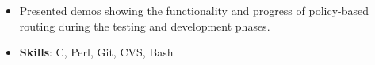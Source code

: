 \documentclass[]{friggeri-cv} %
\begin{document}
\begin{entrylistSkinny}
{\begin{itemize}
  \item Presented demos showing the functionality and progress of policy-based
  routing during the testing and development phases.
  \item {\bf Skills}: C, Perl, Git, CVS, Bash
\end{itemize}
}
\end{entrylistSkinny}
\end{document}
